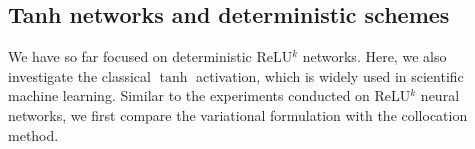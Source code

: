 \documentclass{article}
\theoremstyle{remark}
\begin{document}

\subsection{Tanh networks and deterministic schemes}
We have so far focused on deterministic ReLU$^k$ networks. 
Here, we also investigate the classical $\tanh$ activation, which is widely used in scientific machine learning.
Similar to the experiments conducted on ReLU$^k$ neural networks, we first compare the variational formulation with the collocation method.
\end{document}

